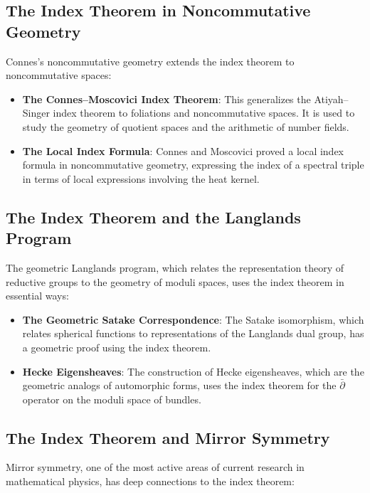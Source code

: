 \subsection{The Index Theorem in Noncommutative Geometry}

Connes's noncommutative geometry extends the index theorem to noncommutative spaces:

\begin{itemize}
\item \textbf{The Connes--Moscovici Index Theorem}: This generalizes the Atiyah--Singer index theorem to foliations and noncommutative spaces. It is used to study the geometry of quotient spaces and the arithmetic of number fields.

\item \textbf{The Local Index Formula}: Connes and Moscovici proved a local index formula in noncommutative geometry, expressing the index of a spectral triple in terms of local expressions involving the heat kernel.
\end{itemize}

\subsection{The Index Theorem and the Langlands Program}

The geometric Langlands program, which relates the representation theory of reductive groups to the geometry of moduli spaces, uses the index theorem in essential ways:

\begin{itemize}
\item \textbf{The Geometric Satake Correspondence}: The Satake isomorphism, which relates spherical functions to representations of the Langlands dual group, has a geometric proof using the index theorem.

\item \textbf{Hecke Eigensheaves}: The construction of Hecke eigensheaves, which are the geometric analogs of automorphic forms, uses the index theorem for the $\bar\partial$ operator on the moduli space of bundles.
\end{itemize}

\subsection{The Index Theorem and Mirror Symmetry}

Mirror symmetry, one of the most active areas of current research in mathematical physics, has deep connections to the index theorem:

